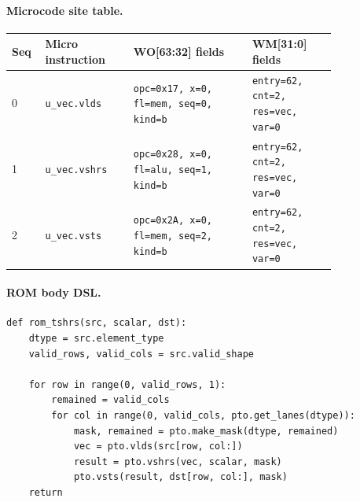 \paragraph{Microcode site table.}
{\scriptsize
\begin{longtable}{@{}R{0.055\linewidth}L{0.23\linewidth}L{0.31\linewidth}L{0.22\linewidth}@{}}
\toprule
Seq & Micro instruction & WO[63:32] fields & WM[31:0] fields \\
 & \texttt{u\_vec.vlds} & \texttt{opc=0x17, x=0, fl=mem, seq=0, kind=b} & \texttt{entry=62, cnt=2, res=vec, var=0} \\
1 & \texttt{u\_vec.vshrs} & \texttt{opc=0x28, x=0, fl=alu, seq=1, kind=b} & \texttt{entry=62, cnt=2, res=vec, var=0} \\
2 & \texttt{u\_vec.vsts} & \texttt{opc=0x2A, x=0, fl=mem, seq=2, kind=b} & \texttt{entry=62, cnt=2, res=vec, var=0} \\
\bottomrule
\end{longtable}
}
\paragraph{ROM body DSL.}
\begin{lstlisting}[style=ptocode]
def rom_tshrs(src, scalar, dst):
    dtype = src.element_type
    valid_rows, valid_cols = src.valid_shape

    for row in range(0, valid_rows, 1):
        remained = valid_cols
        for col in range(0, valid_cols, pto.get_lanes(dtype)):
            mask, remained = pto.make_mask(dtype, remained)
            vec = pto.vlds(src[row, col:])
            result = pto.vshrs(vec, scalar, mask)
            pto.vsts(result, dst[row, col:], mask)
    return
\end{lstlisting}
\Needspace{0.50\textheight}
